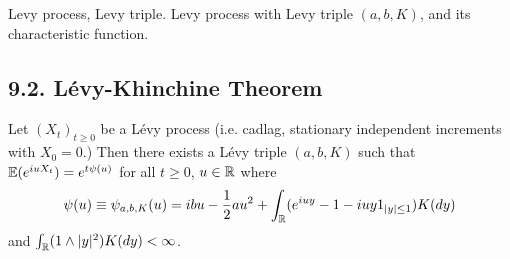 \documentclass[10pt,a4paper]{report}
\begin{document}
Levy process, Levy triple. Levy process with Levy triple $(a,b,K)$, and its characteristic function.

\subsection*{9.2. L\'{e}vy-Khinchine Theorem}

 Let $(X_t)_{t\geq 0}$ be a L\'{e}vy process (i.e. cadlag, stationary independent increments with $X_0=0$.) Then there exists a L\'{e}vy triple $(a,b,K)$ such that $\mathbb{E}(e^{iuX_t}) = e^{t\psi(u)}$ for all $t\geq 0$, $u \in \mathbb{R}$ where
\begin{align*}
\psi(u) \equiv \psi_{a,b,K}(u) =ibu - \frac{1}{2}au^2 + \int_{\mathbb{R}} (e^{iuy}-1-iuy 1_{|y|\leq 1}) K(dy)
\end{align*}
and $\int_{\mathbb{R}} (1\wedge |y|^2) K(dy) < \infty$.
\end{document}
